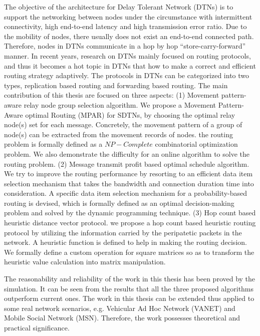 \begin{englishabstract}

The objective of the architecture for Delay Tolerant Network (DTNs) is to support the networking between nodes under the circumstance with intermittent connectivity, high end-to-end latency and high transmission error ratio. Due to the mobility of nodes, there usually does not exist an end-to-end connected path. Therefore, nodes in DTNs communicate in a hop by hop ``store-carry-forward'' manner. In recent years, research on DTNs mainly focused on routing protocols, and thus it becomes a hot topic in DTNs that how to make a correct and efficient routing strategy adaptively. The protocols in DTNs can be categorized into two types, replication based routing and forwarding based routing. The main contribution of this thesis are focused on three aspects: (1) Movement pattern-aware relay node group selection algorithm. We propose a Movement Pattern-Aware optimal Routing (MPAR) for SDTNs, by choosing the optimal relay node(s) set for each message. Concretely, the movement pattern of a group of node(s) can be extracted from the movement records of nodes. the routing problem is formally defined as a $NP-Complete$ combinatorial optimization problem.
We also demonstrate the difficulty for an online algorithm to solve the routing problem. 
(2) Message transmit profit based optimal schedule algorithm. We try to improve the routing performance by resorting to an efficient data item selection mechanism that takes the bandwidth and connection duration time into consideration. A specific data item selection mechanism for a probability-based routing is devised, which is formally defined as an optimal decision-making problem and solved by the dynamic programming technique. (3) Hop count based heuristic distance vector protocol. we propose a hop count based heuristic routing protocol by utilizing the information carried by the peripatetic packets in the network. A heuristic function is defined to help in making the routing decision. We formally define a custom operation for square matrices so as to transform the heuristic value calculation into matrix manipulation.

The reasonability and reliability of the work in this thesis has been proved by the simulation. It can be seen from the results that all the three proposed algorithms outperform current ones. The work in this thesis can be extended thus applied to some real network scenarios, e.g. Vehicular Ad Hoc Network (VANET) and Mobile Social Network (MSN). Therefore, the work possesses theoretical and practical significance.

\begin{figure}[!b]
\end{figure}
\end{englishabstract}
